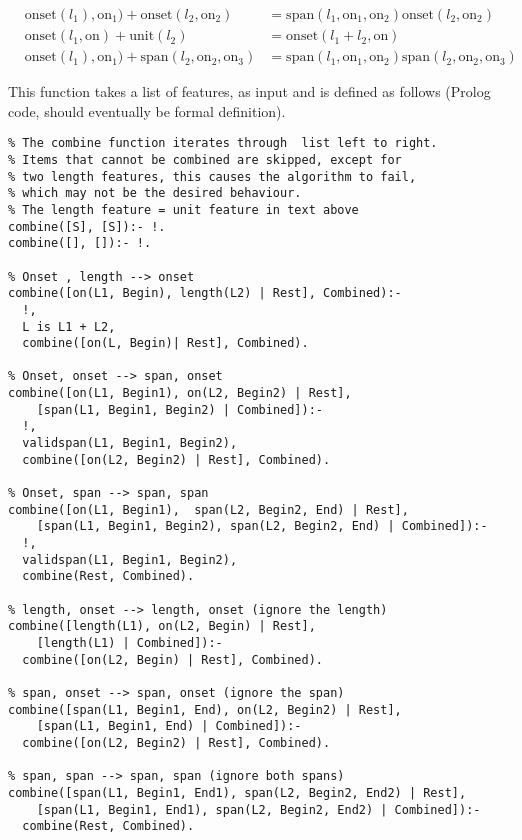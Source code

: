 \documentclass[a4paper,10pt]{article}
\begin{document}
\begin{align}
&\textrm{onset}(l_1), \textrm{on}_1) + \textrm{onset}(l_2, \textrm{on}_2) &= \textrm{span}(l_1, \textrm{on}_1, \textrm{on}_2) \textrm{onset}(l_2, \textrm{on}_2)\\
&\textrm{onset}(l_1, \textrm{on}) + \textrm{unit}(l_2) &= \textrm{onset}(l_1 + l_2, \textrm{on})\\
&\textrm{onset}(l_1), \textrm{on}_1) + \textrm{span}(l_2, \textrm{on}_2, \textrm{on}_3) &= \textrm{span}(l_1, \textrm{on}_1, \textrm{on}_2) \textrm{span}(l_2, \textrm{on}_2, \textrm{on}_3)
\end{align}


This function takes a list of features, as input and is defined as follows (Prolog code, should eventually be formal definition).

\pagebreak
\begin{verbatim}
% The combine function iterates through  list left to right.
% Items that cannot be combined are skipped, except for 
% two length features, this causes the algorithm to fail,
% which may not be the desired behaviour.
% The length feature = unit feature in text above
combine([S], [S]):- !.
combine([], []):- !.

% Onset , length --> onset
combine([on(L1, Begin), length(L2) | Rest], Combined):-
  !,
  L is L1 + L2,
  combine([on(L, Begin)| Rest], Combined).

% Onset, onset --> span, onset
combine([on(L1, Begin1), on(L2, Begin2) | Rest],
    [span(L1, Begin1, Begin2) | Combined]):-
  !,
  validspan(L1, Begin1, Begin2),
  combine([on(L2, Begin2) | Rest], Combined).

% Onset, span --> span, span
combine([on(L1, Begin1),  span(L2, Begin2, End) | Rest], 
    [span(L1, Begin1, Begin2), span(L2, Begin2, End) | Combined]):-
  !,
  validspan(L1, Begin1, Begin2),
  combine(Rest, Combined).

% length, onset --> length, onset (ignore the length)
combine([length(L1), on(L2, Begin) | Rest], 
    [length(L1) | Combined]):-
  combine([on(L2, Begin) | Rest], Combined).

% span, onset --> span, onset (ignore the span)
combine([span(L1, Begin1, End), on(L2, Begin2) | Rest], 
    [span(L1, Begin1, End) | Combined]):-
  combine([on(L2, Begin2) | Rest], Combined).

% span, span --> span, span (ignore both spans)
combine([span(L1, Begin1, End1), span(L2, Begin2, End2) | Rest], 
    [span(L1, Begin1, End1), span(L2, Begin2, End2) | Combined]):-
  combine(Rest, Combined).
\end{verbatim}
\end{document}
